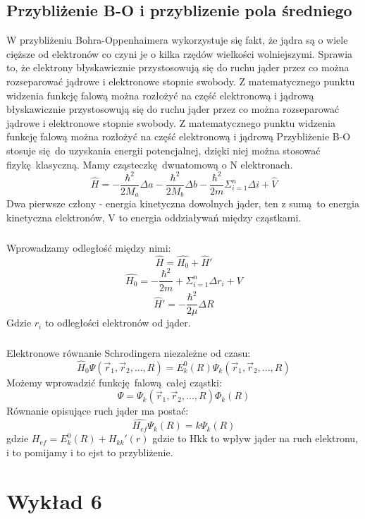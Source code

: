 \documentclass{article}
\begin{document}
			\subsection{Przybliżenie B-O i przyblizenie pola średniego}
			W przybliżeniu Bohra-Oppenhaimera wykorzystuje się fakt, że jądra są o wiele cięższe od elektronów co czyni je o kilka rzędów wielkości wolniejszymi. Sprawia to, że elektrony błyskawicznie przystosowują się do ruchu jąder przez co można rozseparować jądrowe i elektronowe stopnie swobody. Z matematycznego punktu widzenia funkcję falową można rozłożyć na część elektronową i jądrową błyskawicznie przystosowują się do ruchu jąder przez co można rozseparować jądrowe i elektronowe stopnie swobody. Z matematycznego punktu widzenia funkcję falową można rozłożyć na część elektronową i jądrową
            Przybliżenie B-O stosuje się do uzyskania energii potencjalnej, dzięki niej można stosować fizykę klasyczną.
            Mamy cząsteczkę dwuatomową o N elektronach. 
            $$\hat{H} = -\frac{\hbar^2}{2M_a}\Delta a - \frac{\hbar^2}{2M_b}\Delta b - \frac{\hbar^2}{2m} \Sigma^n_{i=1} \Delta i	+ \hat{V}$$
            Dwa pierwsze człony - energia kinetyczna dowolnych jąder, ten z sumą to energia kinetyczna elektronów, V to energia oddziaływań między cząstkami.
            \subparagraph{}Wprowadzamy odległość między nimi:
            $$\hat{H} = \hat{H_0} + \hat{H}'$$
            $$\hat{H_0} = -\frac{\hbar^2}{2m} + \Sigma_{i=1}^n \Delta r_i + V$$
            $$\hat{H}' = -\frac{\hbar^2}{2\mu}\Delta R$$
            Gdzie $r_i$ to odległości elektronów od jąder.
            \subparagraph{}Elektronowe równanie Schrodingera niezależne od czasu:
            $$\hat{H}_0\Psi(\vec{r}_1, \vec{r}_2, ... , R) = E_k^0(R)\Psi_k(\vec{r}_1, \vec{r}_2, ... , R)$$
            Możemy wprowadzić funkcję falową całej cząstki:
            $$\Psi = \Psi_k(\vec{r}_1, \vec{r}_2, ... , R)\Phi_k(R)$$
            Równanie opisujące ruch jąder ma postać:
            $$\hat{H_{ef}}\Psi_k(R) = k\Psi_k(R)$$
            gdzie $H_{ef} = E_k^0(R) + H_{kk}'(r)$
			gdzie to Hkk to wpływ jąder na ruch elektronu, i to pomijamy i to ejst to przybliżenie.
					\section{Wykład 6}
\end{document}
